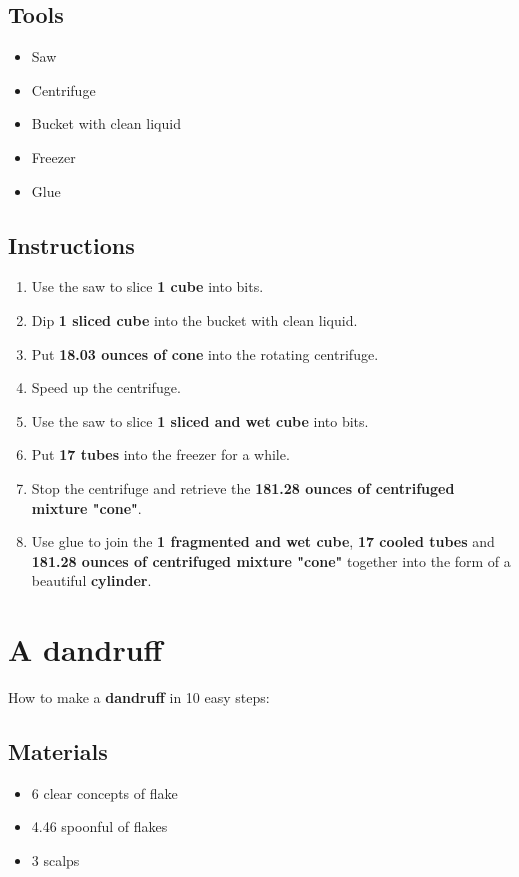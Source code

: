 \documentclass{article}
\begin{document}
\subsection{Tools}\begin{itemize}
\item 
Saw
\item 
Centrifuge
\item 
Bucket with clean liquid
\item 
Freezer
\item 
Glue
\end{itemize}
\subsection{Instructions}\begin{enumerate}
\item 
Use the saw to slice \textbf{1 cube} into bits.
\item 
Dip \textbf{1 sliced cube} into the bucket with clean liquid.
\item 
Put \textbf{18.03 ounces of cone} into the rotating centrifuge.
\item 
Speed up the centrifuge.
\item 
Use the saw to slice \textbf{1 sliced and wet cube} into bits.
\item 
Put \textbf{17 tubes} into the freezer for a while.
\item 
Stop the centrifuge and retrieve the \textbf{181.28 ounces of centrifuged mixture "cone"}.
\item 
Use glue to join the \textbf{1 fragmented and wet cube}, \textbf{17 cooled tubes} and \textbf{181.28 ounces of centrifuged mixture "cone"} together into the form of a beautiful \textbf{cylinder}.
\end{enumerate}
\newpage
\section{A dandruff}How to make a \textbf{dandruff} in 10 easy steps:

\subsection{Materials}\begin{itemize}
\item 
6 clear concepts of flake
\item 
4.46 spoonful of flakes
\item 
3 scalps
\end{itemize}
\end{document}
